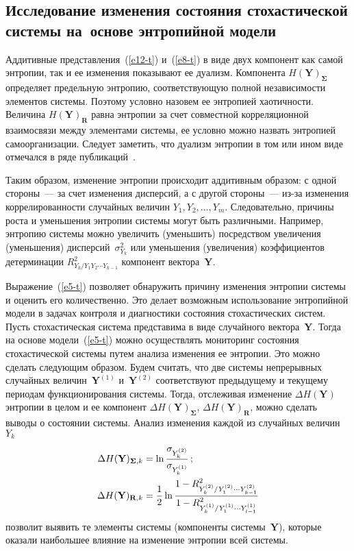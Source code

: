 \begin{multicols}{2}
  \section{Исследование изменения состояния стохастической 
системы на~основе энтропийной модели}
  
  Аддитивные представления~(\ref{e12-t}) и~(\ref{e8-t}) в виде двух компонент 
как самой энтропии, так и ее изменения показывают ее дуализм. Компонента 
$H(\mathbf{Y})_{\boldsymbol{\Sigma}}$ определяет предельную энтропию, со\-от\-вет\-ст\-ву\-ющую 
полной независимости элементов сис\-те\-мы. Поэтому условно назовем ее 
энтропией хао\-тич\-ности. Величина $H(\mathbf{Y})_{\mathbf{R}}$ равна 
энтропии за счет совместной корреляционной взаимосвязи между элементами 
сис\-те\-мы, ее условно можно назвать энтропией самоорганизации. Следует 
заметить, что дуализм энтропии в том или ином виде отмечался в ряде 
публикаций~\cite{1-t, 2-t, 7-t, 9-t, 13-t, 14-t}.
  
  Таким образом, изменение энтропии происходит аддитивным образом: с 
одной стороны~--- за счет изменения дисперсий, а с другой стороны~--- из-за 
изменения коррелированности случайных величин $Y_1,Y_2,\ldots , Y_m$. 
Следовательно, причины рос\-та и уменьшения энтропии сис\-те\-мы могут быть 
различными. Например, энтропию системы можно увеличить (уменьшить) 
посредством увеличения (уменьшения) дисперсий~$\sigma^2_{Y_k}$ или 
уменьшения (\mbox{увеличения}) коэффициентов детерминации 
$R^2_{Y_k/Y_1Y_2\cdots Y_{k-1}}$ компонент вектора~$\mathbf{Y}$.
  
  Выражение~(\ref{e5-t}) позволяет обнаружить причину изменения энтропии 
системы и оценить его количественно. Это делает возможным использование 
энтропийной модели в задачах контроля и диагностики состояния 
стохастических сист\-ем. Пусть стохастическая система представима в виде 
случайного вектора~$\mathbf{Y}$. Тогда на основе модели~(\ref{e5-t}) можно 
осуществлять мониторинг состояния стохастической системы путем анализа 
изменения ее энтропии. Это можно сделать следующим образом. Будем 
считать, что две системы непрерывных случайных величин~$\mathbf{Y}^{(1)}$ 
и~$\mathbf{Y}^{(2)}$ соответствуют предыдущему и текущему периодам 
функционирования системы. Тогда, отслеживая изменение $\Delta 
H(\mathbf{Y})$ энтропии в целом и ее компонент $\Delta 
H(\mathbf{Y})_{\boldsymbol{\Sigma}}$, $\Delta H(\mathbf{Y})_{\mathbf{R}}$, можно сделать 
выводы о состоянии системы. Анализ изменения каждой из случайных 
величин~$Y_k$
  \begin{align*}
  \Delta H(\mathbf{Y})_{\boldsymbol{\Sigma},k} &=\ln 
\displaystyle\frac{\displaystyle \sigma_{Y_k^{(2)}}\mathstrut}{\displaystyle \sigma_{Y_k^{(1)}}\mathstrut}\,;\\
  \Delta H(\mathbf{Y})_{\mathbf{R},k} &=\displaystyle\frac{\displaystyle 1\mathstrut}{\displaystyle 2\mathstrut}\ln 
\displaystyle\frac{\displaystyle 1-R^2_{Y_k^{(2)}/Y_1^{(2)}\cdots Y_{k-1}^{(2)}}\mathstrut}{\displaystyle 1-
R^2_{Y_k^{(1)}/Y_1^{(1)}\cdots Y_{l-1}^{(1)}}\mathstrut}
  \end{align*}
позволит выявить те элементы системы (компоненты системы~$\mathbf{Y}$), 
которые оказали наибольшее влияние на изменение энтропии всей сис\-темы.


\end{multicols}
